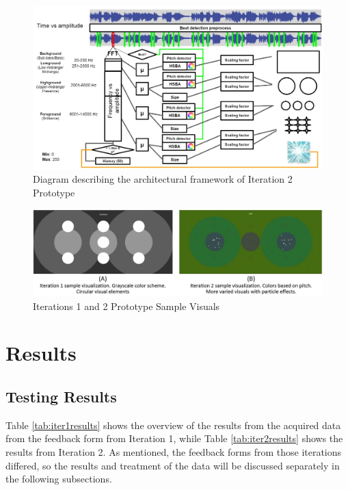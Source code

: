 \begin{figure}[h]
	\centering
	\includegraphics[width=2\columnwidth]{figures/iter2Struct.JPG}
    \caption{Diagram describing the architectural framework of Iteration 2 Prototype}
    \label{fig:iter2Struct}
\end{figure} 

\begin{figure}[h]
	\centering
	\includegraphics[width=2\columnwidth]{figures/visuals.JPG}
    \caption{Iterations 1 and 2 Prototype Sample Visuals}
    \label{fig:visuals}
\end{figure} 


\section{Results}

\subsection{Testing Results}

Table \ref{tab:iter1results} shows the overview of the results from the acquired data from the feedback form from Iteration 1, while Table \ref{tab:iter2results} shows the results from Iteration 2. As mentioned, the feedback forms from those iterations differed, so the results and treatment of the data will be discussed separately in the following subsections.


